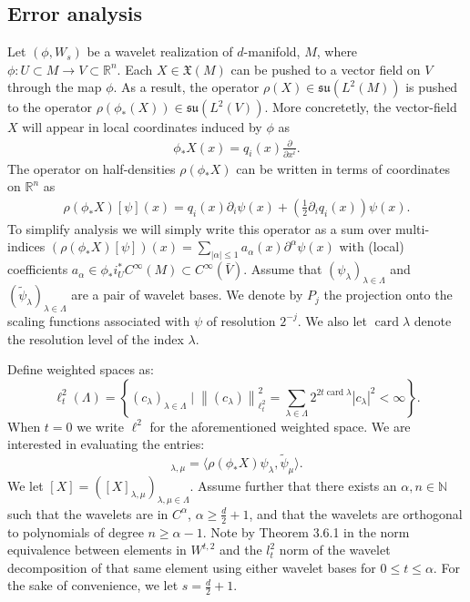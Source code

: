 \documentclass[12pt]{amsart}
\newcommand{\R}{\ensuremath{\mathbb{R}}}
\newcommand{\norm}[1]{\ensuremath{\left\| #1 \right\| }}
\newcommand{\abs}[1]{\ensuremath{ | #1 | }}
\DeclareMathOperator{\card}{card}
\begin{document}
\subsection{Error analysis}
\label{sec:error}
Let $(\phi,W_s)$ be a wavelet realization of $d$-manifold, $M$,
where $\phi: U \subset M \to V \subset \mathbb{R}^n$.
Each $X \in \mathfrak{X}(M)$ can be pushed to a vector field on $V$ through the map $\phi$.
As a result, the operator $\rho(X) \in \mathfrak{su}( L^2(M) )$ is pushed to the operator $\rho(\phi_*(X)) \in \mathfrak{su}(L^2(V))$.
More concretetly, the vector-field $X$ will appear in local coordinates induced by $\phi$ as
\begin{align*}
  \phi_*X(x) = q_i(x) \frac{\partial}{\partial x^i}.
\end{align*}
The operator on half-densities $\rho(\phi_*X)$ can be written in terms of coordinates on $\R^n$ as
\begin{align*}
  \rho(\phi_*X)[\psi](x) =  q_i(x) \partial_i \psi(x) + \left( \frac{1}{2} \partial_i q_i(x) \right) \psi(x).
\end{align*}
 To simplify analysis we will simply write this operator as a sum over multi-indices $(\rho(\phi_*X) [\psi] )(x) = \sum_{|\alpha|\leq 1} a_\alpha(x) \partial^\alpha \psi(x)$ with (local) coefficients $a_\alpha \in \phi_*i_{U}^*C^{\infty}(M) \subset C^{\infty}(\bar{V})$. Assume that $(\psi_\lambda)_{\lambda \in \Lambda}$ and $(\tilde{\psi}_\lambda)_{\lambda \in \Lambda}$ are a pair of wavelet bases. We denote by $P_j$ the projection onto the scaling functions associated with $\psi$ of resolution $2^{-j}$. We also let $\card{\lambda}$ denote the resolution level of the index $\lambda$. 

Define weighted spaces as:
\begin{equation}
	\ell_t^2(\Lambda) = \left\{ (c_\lambda)_{\lambda \in \Lambda}  \mid \norm{(c_\lambda)}_{\ell^2_t}^2 = \sum_{\lambda \in \Lambda} 2^{2t\card{\lambda}}\abs{c_\lambda}^2 < \infty  \right\}.
\end{equation}
When $t = 0$ we write $\ell^2$ for the aforementioned weighted space. We are interested in evaluating the entries:
\begin{equation}
	[X]_{\lambda,\mu} = \langle \rho(\phi_*X) \psi_\lambda, \tilde{\psi}_\mu \rangle.
\end{equation}
We let $[X]=([X]_{\lambda,\mu})_{\lambda,\mu \in \Lambda}$. Assume further that there exists an $\alpha,n \in \mathbb{N}$ such that the wavelets are in $C^{\alpha}$, $\alpha \geq \frac{d}{2} + 1$, and that the wavelets are orthogonal to polynomials of degree $n \geq \alpha - 1$.  Note by Theorem 3.6.1 in \cite{Cohen2003} the norm equivalence between elements in $W^{t,2}$ and the $l_t^2$ norm of the wavelet decomposition of that same element using either wavelet bases for $0\leq t \leq \alpha$. For the sake of convenience, we let $s = \frac{d}{2} + 1$. 
\end{document}

